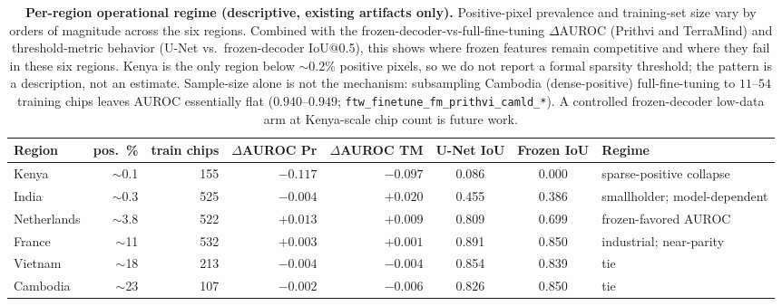 \documentclass{article}
\newcommand{\tablebodygap}{\vspace{0.45em}}
\begin{document}
\begin{table}[H]\centering\small
\caption{\textbf{Per-region operational regime (descriptive, existing artifacts only).}
Positive-pixel prevalence and training-set size vary by orders of magnitude across the
six regions. Combined with the frozen-decoder-vs-full-fine-tuning $\Delta$AUROC (Prithvi
and TerraMind) and threshold-metric behavior (U-Net vs.\ frozen-decoder IoU@0.5), this
shows where frozen features remain competitive and where they fail in these six regions. Kenya is the
only region below $\sim0.2\%$ positive pixels, so we do not report a formal sparsity
threshold; the pattern is a description, not an estimate. Sample-size alone is not the
mechanism: subsampling Cambodia (dense-positive) full-fine-tuning to $11$--$54$ training
chips leaves AUROC essentially flat ($0.940$--$0.949$; \texttt{ftw\_finetune\_fm\_prithvi\_camld\_*}).
A controlled frozen-decoder low-data arm at Kenya-scale chip count is future work.}
\label{tab:regional_regime}
\tablebodygap
\footnotesize
\setlength{\tabcolsep}{3pt}
\begin{tabular}{@{}lrrrrccl@{}}
\toprule
Region & pos.\ \% & train chips & $\Delta$AUROC Pr & $\Delta$AUROC TM & U-Net IoU & Frozen IoU & Regime \\
\midrule
Kenya       & $\sim$0.1 & 155 & $-0.117$ & $-0.097$ & 0.086 & 0.000 & sparse-positive collapse \\
India       & $\sim$0.3 & 525 & $-0.004$ & $+0.020$ & 0.455 & 0.386 & smallholder; model-dependent \\
Netherlands & $\sim$3.8 & 522 & $+0.013$ & $+0.009$ & 0.809 & 0.699 & frozen-favored AUROC \\
France      & $\sim$11  & 532 & $+0.003$ & $+0.001$ & 0.891 & 0.850 & industrial; near-parity \\
Vietnam     & $\sim$18  & 213 & $-0.004$ & $-0.004$ & 0.854 & 0.839 & tie \\
Cambodia    & $\sim$23  & 107 & $-0.002$ & $-0.006$ & 0.826 & 0.850 & tie \\
\bottomrule
\end{tabular}
\end{table}
\end{document}

